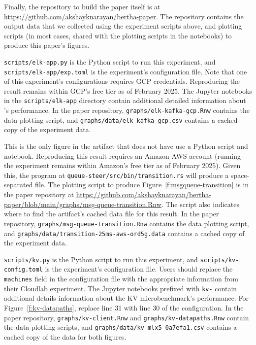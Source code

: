 \begin{appendix}
Finally, the repository to build the paper itself is at \url{https://github.com/akshayknarayan/bertha-paper}. The repository contains the output data that we collected using the experiment scripts above, and plotting scripts (in most cases, shared with the plotting scripts in the notebooks) to produce this paper's figures.

 \texttt{scripts/elk-app.py} is the Python script to run this experiment, and \texttt{scripts/elk-app/exp.toml} is the experiment's configuration file. Note that one of this experiment's configurations requires GCP credentials. Reproducing the result remains within GCP's free tier as of February 2025. The Jupyter notebooks in the \texttt{scripts/elk-app} directory contain additional detailed information about \etlapp's performance.
In the paper repository, \texttt{graphs/elk-kafka-gcp.Rnw} contains the data plotting script, and \texttt{graphs/data/elk-kafka-gcp.csv} contains a cached copy of the experiment data.

 This is the only figure in the artifact that does not have use a Python script and notebook. Reproducing this result requires an Amazon AWS account (running the experiment remains within Amazon's free tier as of February 2025). Given this, the program at \texttt{queue-steer/src/bin/transition.rs} will produce a space-separated file.
The plotting script to produce Figure~\ref{f:msgqueue-transition} is in the paper repository at \url{https://github.com/akshayknarayan/bertha-paper/blob/main/graphs/msg-queue-transition.Rnw}. The script also indicates where to find the artifact's cached data file for this result.
In the paper repository, \texttt{graphs/msg-queue-transition.Rnw} contains the data plotting script, and \texttt{graphs/data/transition-25ms-aws-ord5g.data} contains a cached copy of the experiment data.

 \texttt{scripts/kv.py} is the Python script to run this experiment, and \texttt{scripts/kv-config.toml} is the experiment's configuration file. Users should replace the \texttt{machines} field in the configuration file with the appropriate information from their Cloudlab experiment. The Jupyter notebooks prefixed with \texttt{kv-} contain additional details information about the KV microbenchmark's performance. For Figure~\ref{f:kv-datapaths}, replace line 31 with line 30 of the configuration.
In the paper repository, \texttt{graphs/kv-client.Rnw} and \texttt{graphs/kv-datapaths.Rnw} contain the data plotting scripts, and \texttt{graphs/data/kv-mlx5-0a7efa1.csv} contains a cached copy of the data for both figures.


\end{appendix}
